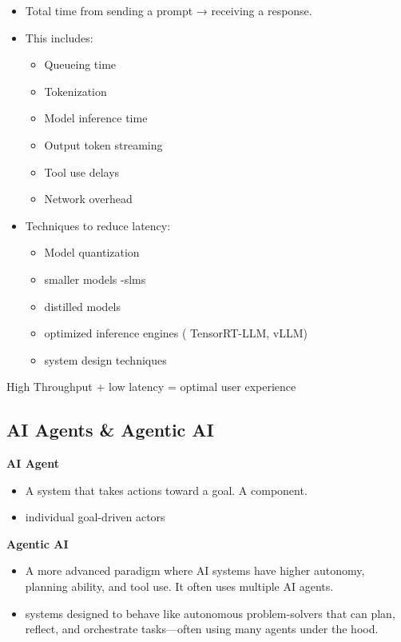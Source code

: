 \documentclass[10pt,a4paper]{article}
\begin{document}
\begin{itemize}

\item
  Total time from sending a prompt → receiving a response.
\item
  This includes:

  \begin{itemize}
  
  \item
    Queueing time
  \item
    Tokenization
  \item
    Model inference time
  \item
    Output token streaming
  \item
    Tool use delays
  \item
    Network overhead
  \end{itemize}
\item
  Techniques to reduce latency:

  \begin{itemize}
  
  \item
    Model quantization
  \item
    smaller models -slms
  \item
    distilled models
  \item
    optimized inference engines ( TensorRT-LLM, vLLM)
  \item
    system design techniques
  \end{itemize}
\end{itemize}

High Throughput + low latency = optimal user experience

\subsection{AI Agents \& Agentic AI}\label{ai-agents--agentic-ai}

\textbf{AI Agent}

\begin{itemize}

\item
  A system that takes actions toward a goal. A component.
\item
  individual goal-driven actors
\end{itemize}

\textbf{Agentic AI}

\begin{itemize}
\item
  A more advanced paradigm where AI systems have higher autonomy, planning ability, and tool use. It often uses multiple AI agents.
\item
  systems designed to behave like autonomous problem-solvers that can plan, reflect, and orchestrate tasks---often using many agents under the hood.
\end{itemize}
\end{document}
